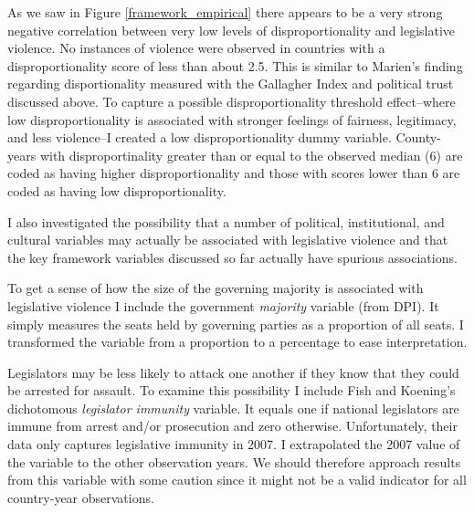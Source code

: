 \documentclass[a4paper]{article}\usepackage{graphicx, color}
\begin{document}
As we saw in Figure \ref{framework_empirical} there appears to be a very strong negative correlation between very low levels of disproportionality and legislative violence. No instances of violence were observed in countries with a disproportionality score of less than about 2.5. This is similar to Marien's \citeyearpar{Marien2011} finding regarding disportionality measured with the Gallagher Index and political trust discussed above. To capture a possible disproportionality threshold effect--where low disproportionality is associated with stronger feelings of fairness, legitimacy, and less violence--I created a low disproportionality dummy variable. County-years with disproportinality greater than or equal to the observed median (6) are coded as having higher disproportionality and those with scores lower than 6 are coded as having low disproportionality. 

I also investigated the possibility that a number of political, institutional, and cultural variables may actually be associated with legislative violence and that the key framework variables discussed so far actually have spurious associations. 

To get a sense of how the size of the governing majority is associated with legislative violence I include the government {\emph{majority}} variable (from DPI). It simply measures the seats held by governing parties as a proportion of all seats. I transformed the variable from a proportion to a percentage to ease interpretation. 

Legislators may be less likely to attack one another if they know that they could be arrested for assault. To examine this possibility I include Fish and Koening's \citeyearpar{Fish2009} dichotomous \emph{legislator immunity} variable. It equals one if national legislators are immune from arrest and/or prosecution and zero otherwise. Unfortunately, their data only captures legislative immunity in 2007. I extrapolated the 2007 value of the variable to the other observation years. We should therefore approach results from this variable with some caution since it might not be a valid indicator for all country-year observations.
\end{document}
